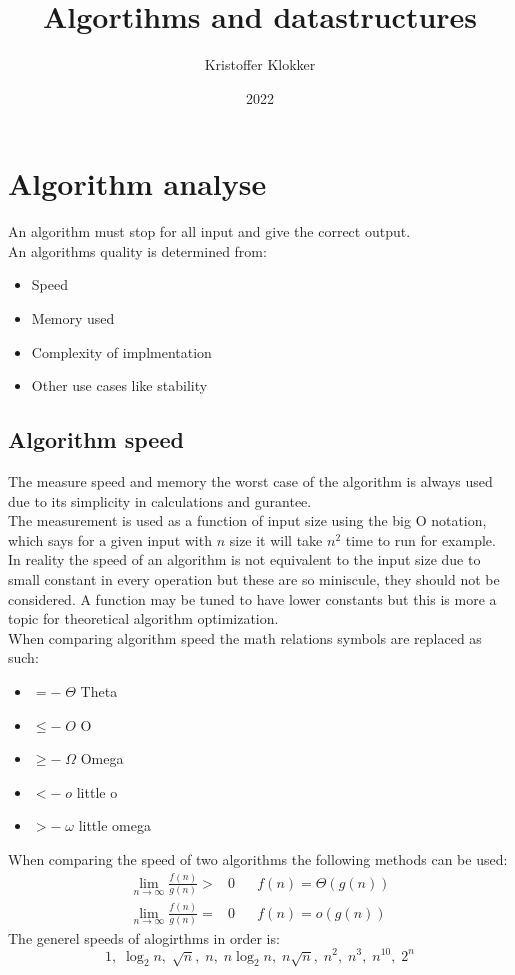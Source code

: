 \documentclass[12pt, a4paper]{article}
\title{Algortihms and datastructures}
\date{2022}
\author{Kristoffer Klokker}
\begin{document}
	\maketitle
	\clearpage
	\tableofcontents
	\clearpage
		\section{Algorithm analyse}
			An algorithm must stop for all input and give the correct output.\\
			An algorithms quality is determined from:
			\begin{itemize}
				\item Speed
				\item Memory used
				\item Complexity of implmentation
				\item Other use cases like stability
			\end{itemize}
			\subsection{Algorithm speed}
				The measure speed and memory the worst case of the algorithm is always used due to its simplicity in calculations and gurantee. \\
				The measurement is used as a function of input size using the big O notation, which says for a given input with $n$ size it will take $n^2$  time to run for example.\\
				In reality the speed of an algorithm is not equivalent to the input size due to small constant in every operation but these are so miniscule, they should not be considered. A function may be tuned to have lower constants but this is more a topic for theoretical algorithm optimization.\\
				When comparing algorithm speed the math relations symbols are replaced as such:
				\begin{itemize}
					\item $= -\; \Theta$ Theta
					\item $\leq -\; O$ O
					\item $\geq - \;\Omega$ Omega
					\item $< -\; o$ little o
					\item $> - \;\omega$ little omega
				\end{itemize}
				When comparing the speed of two algorithms the following methods can be used:
				\begin{align*}
					\lim\limits_{n\rightarrow \infty}\frac{f(n)}{g(n)}>&0  &&f(n)=\Theta(g(n))\\
					\lim\limits_{n\rightarrow \infty}\frac{f(n)}{g(n)}=&0  &&f(n)=o(g(n))
				\end{align*}
				The generel speeds of alogirthms in order is:
				$$1,\; \log_2n,\; \sqrt{n},\; n,\; n\log_2n,\; n\sqrt{n},\; n^2,\; n^3,\; n^{10},\; 2^n$$
\end{document}
